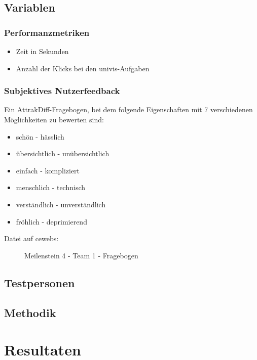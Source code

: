 \documentclass[a4paper,10pt]{scrartcl}
\begin{document}
\subsection{Variablen}

\subsubsection{Performanzmetriken}

\begin{itemize}
 \item Zeit in Sekunden
 \item Anzahl der Klicks bei den univis-Aufgaben
\end{itemize}

\subsubsection{Subjektives Nutzerfeedback}

Ein AttrakDiff-Fragebogen, bei dem folgende Eigenschaften mit 7 verschiedenen Möglichkeiten zu bewerten sind:

\begin{itemize}
\item schön - hässlich
\item übersichtlich - unübersichtlich   
\item einfach - kompliziert 
\item menschlich - technisch 
\item verständlich - unverständlich 
\item fröhlich - deprimierend 
\end{itemize}

\begin{description}
 \item[Datei auf cewebs:]Meilenstein 4 - Team 1 - Fragebogen
\end{description}

\subsection{Testpersonen}

\subsection{Methodik}



\section{Resultaten} 
\end{document}
